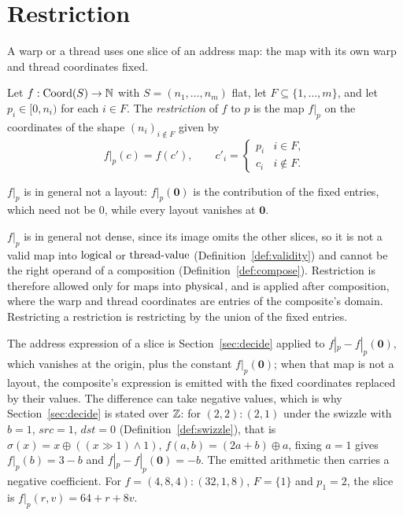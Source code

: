 \section{Restriction}\label{sec:restrict}

A warp or a thread uses one slice of an address map: the map with its own
warp and thread coordinates fixed.

\begin{definition}[Restriction]\label{def:restrict}
Let $f : \mathrm{Coord}(S) \to \mathbb{N}$ with $S = (n_1,\dots,n_m)$ flat, let
$F \subseteq \{1,\dots,m\}$, and let $p_i \in [0,n_i)$ for each $i \in F$.
The \emph{restriction} of $f$ to $p$ is the map $f|_p$ on the coordinates of
the shape $(n_i)_{i \notin F}$ given by
\[
f|_p(c) = f(c'), \qquad
c'_i = \begin{cases} p_i & i \in F,\\ c_i & i \notin F. \end{cases}
\]
\end{definition}

$f|_p$ is in general not a layout: $f|_p(\mathbf{0})$ is the contribution
of the fixed entries, which need not be $0$, while every layout vanishes at
$\mathbf{0}$.

$f|_p$ is in general not dense, since its image omits the other slices, so
it is not a valid map into $\textrm{logical}$ or $\textrm{thread-value}$ (Definition~\ref{def:validity})
and cannot be the right operand of a composition
(Definition~\ref{def:compose}). Restriction is therefore allowed only for
maps into $\textrm{physical}$, and is applied after composition, where the warp and
thread coordinates are entries of the composite's domain. Restricting a
restriction is restricting by the union of the fixed entries.

The address expression of a slice is Section~\ref{sec:decide} applied to
$f|_p - f|_p(\mathbf{0})$, which vanishes at the origin, plus the constant
$f|_p(\mathbf{0})$; when that map is not a layout, the composite's expression
is emitted with the fixed coordinates replaced by their values. The difference
can take negative values, which is why Section~\ref{sec:decide} is stated
over $\mathbb{Z}$: for $(2,2){:}(2,1)$ under the swizzle with $b = 1$, $\mathit{src} = 1$, $\mathit{dst} = 0$
(Definition~\ref{def:swizzle}), that is $\sigma(x) = x \oplus ((x \gg 1) \wedge 1)$,
$f(a,b) = (2a+b) \oplus a$, fixing $a = 1$ gives $f|_p(b) = 3 - b$ and
$f|_p - f|_p(\mathbf{0}) = -b$. The emitted arithmetic then carries a negative
coefficient. For
$f = (4,8,4){:}(32,1,8)$, $F = \{1\}$ and $p_1 = 2$, the slice is
$f|_p(r,v) = 64 + r + 8v$.
